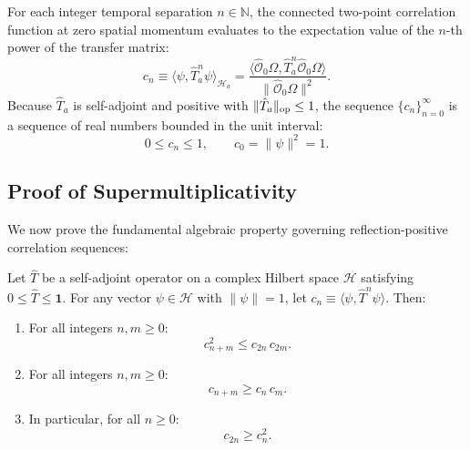 For each integer temporal separation $n \in \mathbb{N}$, the connected two-point correlation function at zero spatial momentum evaluates to the expectation value of the $n$-th power of the transfer matrix:
\begin{equation}
\label{eq:cn_sequence_def}
c_n \equiv \langle \psi, \hat{T}_a^n \psi \rangle_{\mathcal{H}_a} = \frac{\langle \hat{\mathcal{O}}_0 \Omega, \hat{T}_a^n \hat{\mathcal{O}}_0 \Omega \rangle}{\|\hat{\mathcal{O}}_0 \Omega\|^2}.
\end{equation}
Because $\hat{T}_a$ is self-adjoint and positive with $\|\hat{T}_a\|_{\mathrm{op}} \le 1$, the sequence $\{c_n\}_{n=0}^\infty$ is a sequence of real numbers bounded in the unit interval:
\begin{equation}
0 \le c_n \le 1, \qquad c_0 = \|\psi\|^2 = 1.
\end{equation}

\subsection{Proof of Supermultiplicativity}
\label{subsec:supermultiplicativity_proof}

We now prove the fundamental algebraic property governing reflection-positive correlation sequences:

\begin{lemma}
\label{lem:supermultiplicativity}
Let $\hat{T}$ be a self-adjoint operator on a complex Hilbert space $\mathcal{H}$ satisfying $0 \le \hat{T} \le \mathbf{1}$. For any vector $\psi \in \mathcal{H}$ with $\|\psi\| = 1$, let $c_n \equiv \langle \psi, \hat{T}^n \psi \rangle$. Then:
\begin{enumerate}
    \item For all integers $n, m \ge 0$:
    \begin{equation}
    \label{eq:cauchy_schwarz_correlator}
    c_{n+m}^2 \le c_{2n} \, c_{2m}.
    \end{equation}
    \item For all integers $n, m \ge 0$:
    \begin{equation}
    \label{eq:supermultiplicativity_ineq}
    c_{n+m} \ge c_n \, c_m.
    \end{equation}
    \item In particular, for all $n \ge 0$:
    \begin{equation}
    \label{eq:even_step_square}
    c_{2n} \ge c_n^2.
    \end{equation}
\end{enumerate}
\end{lemma}

